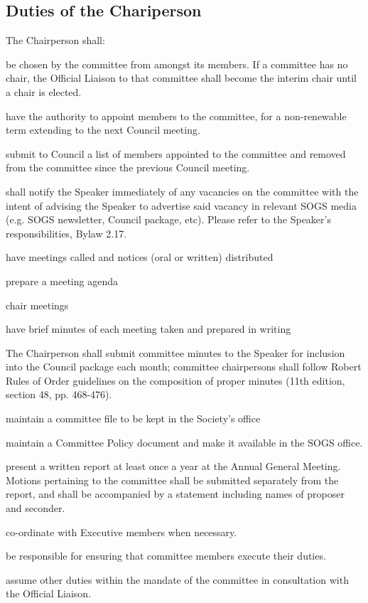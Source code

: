\subsection{Duties of the Chariperson}
The Chairperson shall:

\begin{longenum}[ label*=\thesubsection.\arabic*., align=left]
	\item be chosen by the committee from amongst its members. If a committee has no chair, the Official Liaison to that committee shall become the interim chair until a chair is elected.
    \item have the authority to appoint members to the committee, for a non-renewable term extending to the next Council meeting. 
    \item submit to Council a list of members appointed to the committee and removed from the committee since the previous Council meeting.
    \item shall notify the Speaker immediately of any vacancies on the committee with the intent of advising the Speaker to advertise said vacancy in relevant SOGS media (e.g. SOGS newsletter, Council package, etc). Please refer to the Speaker's responsibilities, Bylaw 2.17.
    \item have meetings called and notices (oral or written) distributed
    \item prepare a meeting agenda
    \item chair meetings
    \item have brief minutes of each meeting taken and prepared in writing
    \begin{longenum}[ label*=\arabic*., align=left]
		\item The Chairperson shall submit committee minutes to the Speaker for inclusion into the Council package each month; committee chairpersons shall follow Robert Rules of Order guidelines on the composition of proper minutes (11th edition, section 48, pp. 468-476).
	\end{longenum}
    \item maintain a committee file to be kept in the Society's office
    \item maintain a Committee Policy document and make it available in the SOGS office.
    \item present a written report at least once a year at the Annual General Meeting. Motions pertaining to the committee shall be submitted separately from the report, and shall be accompanied by a statement including names of proposer and seconder.
    \item co-ordinate with Executive members when necessary. 
    \item be responsible for ensuring that committee members execute their duties.
    \item assume other duties within the mandate of the committee in consultation with the Official Liaison.
\end{longenum}

